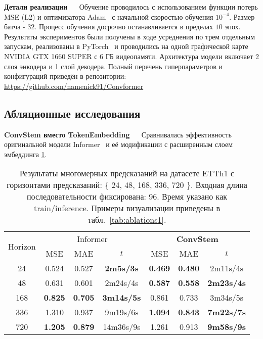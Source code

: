 \textbf{Детали реализации} $\quad$ Обучение проводилось с использованием функции потерь MSE (L2) 
и оптимизатора Adam~\cite{adam} с начальной скоростью обучения $10^{-4}$. 
Размер батча - $32$. Процесс обучения досрочно останавливается в пределах 
$10$ эпох. 
Результаты экспериментов были получены в ходе усреднения по трем отдельным запускам, 
реализованы в PyTorch~\cite{pytorch} и проводились на 
одной графической карте NVIDIA GTX 1660 SUPER с 6 ГБ видеопамяти. 
Архитектура модели включает 2 слоя энкодера и 1 слой декодера.
Полный перечень гиперпараметров и конфигураций приведён в репозитории: 
\href{https://github.com/namenick91/Convformer}{https://github.com/namenick91/Convformer}

\subsection{Абляционные исследования}

\label{sec:ablations1}
\textbf{ConvStem вместо TokenEmbedding} $\quad$ Сравнивалась эффективность 
оригинальной модели Informer~\cite{informer} и её модификации с 
расширенным слоем эмбеддинга \ref{tab:etth1-convstem}.


\begin{table}[!ht]
    \centering
    \begin{tabular}{c| ccc ccc}
    \toprule
    \multicolumn{1}{c}{\multirow{2}{*}{Horizon}} & 
    \multicolumn{3}{c}{Informer}                 & 
    \multicolumn{3}{c}{\textbf{ConvStem}}                 \\
    \cmidrule(lr){2-4} \cmidrule(lr){5-7}
    \multicolumn{1}{c}{} & {MSE} & {MAE} & {$t$} & {MSE} & {MAE} & {$t$} \\
    \midrule
    24   & 0.524 & 0.527 & \textbf{2m5s/3s} & \textbf{0.469} & \textbf{0.480} & 2m11s/4s \\
    48   & 0.631 & 0.601 & 2m24s/4s & \textbf{0.587} & \textbf{0.558} & \textbf{2m23s/4s} \\
    168  & \textbf{0.825} & \textbf{0.705} & \textbf{3m14s/5s} & 0.861 & 0.733 & 3m34s/5s \\
    336  & 1.310 & 0.937 & 9m19s/6s & \textbf{1.094} & \textbf{0.843} & \textbf{7m22s/7s} \\
    720  & \textbf{1.205} & \textbf{0.879} & 14m36s/9s & 1.261 & 0.913 & \textbf{9m58s/9s} \\
    \bottomrule
    \end{tabular}
    \vspace{3pt}
    \caption{Результаты многомерных предсказаний на датасете ETTh1 с 
    горизонтами предсказаний: \{ 24, 48, 168, 336, 720 \}. 
    Входная длина последовательности фиксирована: 96.
    Время указано как train/inference.
    Примеры визуализации приведены в табл.~\ref{tab:ablations1}.}
    \label{tab:etth1-convstem}
\end{table}

